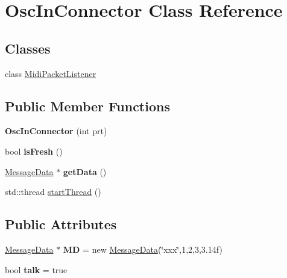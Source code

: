 \hypertarget{classOscInConnector}{}\section{Osc\+In\+Connector Class Reference}
\label{classOscInConnector}
\subsection*{Classes}
\begin{DoxyCompactItemize}
\item 
class \hyperlink{classOscInConnector_1_1MidiPacketListener}{Midi\+Packet\+Listener}
\end{DoxyCompactItemize}
\subsection*{Public Member Functions}
\begin{DoxyCompactItemize}
\item 
{\bfseries Osc\+In\+Connector} (int prt)\hypertarget{classOscInConnector_acb8cca9cec941690ed0dcee6611c4553}{}\label{classOscInConnector_acb8cca9cec941690ed0dcee6611c4553}

\item 
bool {\bfseries is\+Fresh} ()\hypertarget{classOscInConnector_a6603048c9ba0e9356a8dd0f5ffc1055f}{}\label{classOscInConnector_a6603048c9ba0e9356a8dd0f5ffc1055f}

\item 
\hyperlink{classMessageData}{Message\+Data} $\ast$ {\bfseries get\+Data} ()\hypertarget{classOscInConnector_aa7130d46061b498d0f8648c0bd9c4146}{}\label{classOscInConnector_aa7130d46061b498d0f8648c0bd9c4146}

\item 
std\+::thread \hyperlink{classOscInConnector_af546d19cf2adc1ed7c701a4804586cb9}{start\+Thread} ()
\end{DoxyCompactItemize}
\subsection*{Public Attributes}
\begin{DoxyCompactItemize}
\item 
\hyperlink{classMessageData}{Message\+Data} $\ast$ {\bfseries MD} = new \hyperlink{classMessageData}{Message\+Data}(\char`\"{}xxx\char`\"{},1,2,3,3.\+14f)\hypertarget{classOscInConnector_a5ff52e9ac740d92aec0eb9f1eee00ddf}{}\label{classOscInConnector_a5ff52e9ac740d92aec0eb9f1eee00ddf}

\item 
bool {\bfseries talk} = true\hypertarget{classOscInConnector_a0472faba62d4db290aeb71326b31d5cc}{}\label{classOscInConnector_a0472faba62d4db290aeb71326b31d5cc}

\end{DoxyCompactItemize}


